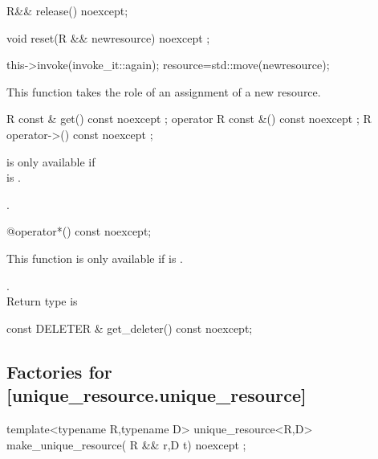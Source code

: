 \documentclass[ebook,11pt,article]{memoir}
\begin{document}
\begin{itemdecl}
R&& release() noexcept;
\end{itemdecl}

\pnum
\effects {}

\pnum
\returns {}

\begin{itemdecl}
void reset(R && newresource) noexcept ;
\end{itemdecl}

\pnum
\effects 
\begin{codeblock}
this->invoke(invoke_it::again); 
resource=std::move(newresource);
\end{codeblock}

\pnum
\enternote This function takes the role of an assignment of a new resource.
\exitnote

\begin{itemdecl}
R const & get() const noexcept ;
operator  R const &() const noexcept ;
R operator->() const noexcept ;
\end{itemdecl}

\pnum
\requires {} is only available if \\
 is . 

\pnum
\returns {}.

\begin{itemdecl}
@\seebelow@  operator*() const noexcept;
\end{itemdecl}

\pnum
\requires This function is only available if  is . 

\pnum
\returns {}. 
\\Return type is 


\begin{itemdecl}
const DELETER & get_deleter() const noexcept;
\end{itemdecl}

\pnum
\returns {}

\subsection {Factories for  [unique_resource.unique_resource]}
\begin{itemdecl}
template<typename R,typename D>
unique_resource<R,D>
make_unique_resource( R && r,D t) noexcept ;
\end{itemdecl}
\end{document}
